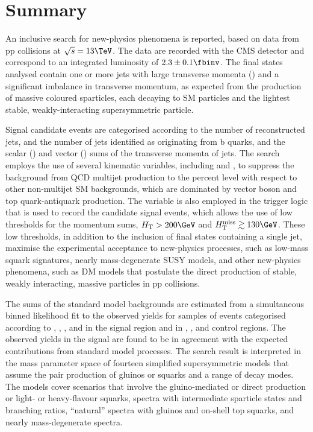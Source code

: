 \section{Summary}
\label{sec:summary}

An inclusive search for new-physics phenomena is reported, based on
data from pp collisions at $\sqrt{s} = 13\TeV$. The data are recorded
with the CMS detector and correspond to an integrated luminosity of
$2.3 \pm 0.1 \fbinv$. The final states analysed contain one or more
jets with large transverse momenta (\Pt) and a significant imbalance
in transverse momentum, as expected from the production of massive
coloured sparticles, each decaying to SM particles and the lightest
stable, weakly-interacting supersymmetric particle.

Signal candidate events are categorised according to the number of
reconstructed jets, and the number of jets identified as originating
from b quarks, and the scalar (\scalht) and vector (\HTmiss) sums of
the transverse momenta of jets.  The search employs the use of several
kinematic variables, including \alphat and \bdphi, to suppress the
background from QCD multijet production to the percent level with
respect to other non-multijet SM backgrounds, which are dominated by
vector boson and top quark-antiquark production. The \alphat variable
is also employed in the trigger logic that is used to record the
candidate signal events, which allows the use of low thresholds for
the momentum sums, $\scalht > 200\GeV$ and $\HTmiss \gtrsim
130\GeV$. These low thresholds, in addition to the inclusion of final
states containing a single jet, maximise the experimental acceptance
to new-physics processes, such as low-mass squark signatures, nearly
mass-degenerate SUSY models, and other new-physics phenomena, such as
DM models that postulate the direct production of stable, weakly
interacting, massive particles in pp collisions.

The sums of the standard model backgrounds are estimated from a
simultaneous binned likelihood fit to the observed yields for samples
of events categorised according to \njet, \nb, \scalht, and \HTmiss in
the signal region and in \mj, \mmj, and \gj control regions. The
observed yields in the signal are found to be in agreement with the
expected contributions from standard model processes.  The search
result is interpreted in the mass parameter space of fourteen 
simplified supersymmetric models that assume the pair production of
gluinos or squarks and a range of decay modes. The models cover
scenarios that involve the gluino-mediated or direct production or
light- or heavy-flavour squarks, spectra with intermediate sparticle
states and branching ratios, ``natural'' spectra with gluinos and
on-shell top squarks, and nearly mass-degenerate spectra.

